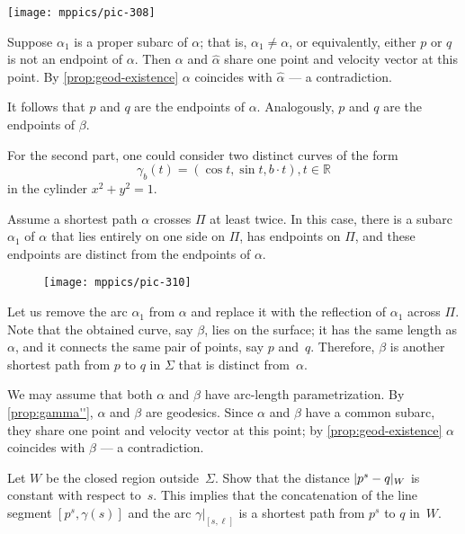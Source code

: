 \begin{multicols}{2}
\begin{Figure}
\vskip-0mm
\centering
\texttt{[image: mppics/pic-308]}
\vskip0mm
\end{Figure}

Suppose $\alpha_1$ is a proper subarc of $\alpha$;
that is, $\alpha_1\ne\alpha$, or equivalently, either $p$ or $q$ is not an endpoint of $\alpha$.
Then $\alpha$ and $\hat\alpha$ share one point and velocity vector at this point.
By \ref{prop:geod-existence} $\alpha$ coincides with $\hat\alpha$ --- a contradiction.

It follows that $p$ and $q$ are the endpoints of $\alpha$.
Analogously, $p$ and $q$ are the endpoints of $\beta$.

For the second part, one could consider two distinct curves of the form 
\[ \gamma_b(t) = ( \cos t , \sin t , b\cdot t ) , t \in \mathbb{R} \]
in the cylinder $x^2 + y^2 =1$.

Assume a shortest path $\alpha$ crosses $\Pi$ at least twice.
In this case, there is a subarc $\alpha_1$ of $\alpha$ that lies entirely on one side on $\Pi$, has endpoints on $\Pi$, and these endpoints are distinct from the endpoints of $\alpha$.
 
\begin{wrapfigure}{r}{38 mm}
\vskip-4mm
\centering
\texttt{[image: mppics/pic-310]}
\vskip0mm
\end{wrapfigure}

Let us remove the arc $\alpha_1$ from $\alpha$ and replace it with the reflection of $\alpha_1$ across $\Pi$.
Note that the obtained curve, say $\beta$, lies on the surface;
it has the same length as $\alpha$, and it connects the same pair of points, say $p$ and~$q$.
Therefore, $\beta$ is another shortest path from $p$ to $q$ in $\Sigma$ that is distinct from~$\alpha$.

We may assume that both $\alpha$ and $\beta$ have arc-length parametrization.
By \ref{prop:gamma''}, $\alpha$ and $\beta$ are geodesics.
Since $\alpha$ and $\beta$ have a common subarc, they share one point and velocity vector at this point;
by \ref{prop:geod-existence} $\alpha$ coincides with $\beta$ --- a contradiction.

Let $W$ be the closed region outside~$\Sigma$.
Show that the distance $\dist{p^s}{q}W$ is constant with respect to~$s$.
This implies that the concatenation of the line segment $[p^s,\gamma(s)]$ and the arc $\gamma|_{[s,\ell]}$ is a shortest path from $p^s$ to $q$ in~$W$.


\end{multicols}
